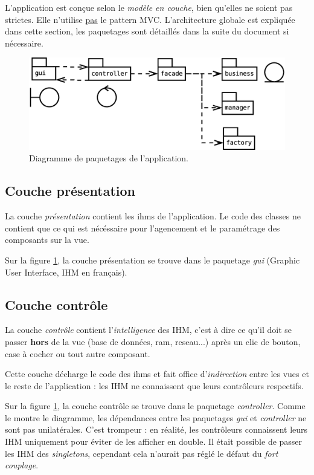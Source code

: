\label{partie_architecture}
L'application est conçue selon le \textit{modèle en couche}, bien qu'elles ne soient pas strictes.
Elle n'utilise \underline{pas} le pattern \gls{MVC}.
L'architecture globale est expliquée dans cette section, les paquetages sont détaillés dans la suite du document si nécessaire.

\begin{figure}[!h]
  \centering
  \includegraphics[width=14cm]{images/paquetage.eps}
  \caption{Diagramme de paquetages de l'application.}
  \label{diagramme_de_paquetage_idb}
\end{figure}

\subsection{Couche présentation}
La couche \textit{présentation} contient les \glspl{ihm} de l'application.
Le code des classes ne contient que ce qui est nécéssaire pour l'agencement et le paramétrage des composants sur la vue.

Sur la figure \ref{diagramme_de_paquetage_idb}, la couche présentation se trouve dans le paquetage \textit{gui} (Graphic User Interface, IHM en français).

\subsection{Couche contrôle}
La couche \textit{contrôle} contient l'\textit{intelligence} des IHM, c'est à dire ce qu'il doit se passer \textbf{hors} de la vue (base de données, ram, reseau...) après un clic de bouton, case à cocher ou tout autre composant.

Cette couche décharge le code des \glspl{ihm} et fait office d'\textit{indirection} entre les vues et le reste de l'application : les IHM ne connaissent que leurs contrôleurs respectifs.

Sur la figure \ref{diagramme_de_paquetage_idb}, la couche contrôle se trouve dans le paquetage \textit{controller}.
Comme le montre le diagramme, les dépendances entre les paquetages \textit{gui} et \textit{controller} ne sont pas unilatérales.
C'est trompeur : en réalité, les contrôleurs connaissent leurs IHM uniquement pour éviter de les afficher en double.
Il était possible de passer les IHM des \textit{singletons}, cependant cela n'aurait pas réglé le défaut du \textit{fort couplage}.

